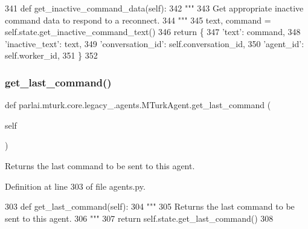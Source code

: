 \begin{DoxyCode}
341     \textcolor{keyword}{def }get\_inactive\_command\_data(self):
342         \textcolor{stringliteral}{"""}
343 \textcolor{stringliteral}{        Get appropriate inactive command data to respond to a reconnect.}
344 \textcolor{stringliteral}{        """}
345         text, command = self.state.get\_inactive\_command\_text()
346         \textcolor{keywordflow}{return} \{
347             \textcolor{stringliteral}{'text'}: command,
348             \textcolor{stringliteral}{'inactive\_text'}: text,
349             \textcolor{stringliteral}{'conversation\_id'}: self.conversation\_id,
350             \textcolor{stringliteral}{'agent\_id'}: self.worker\_id,
351         \}
352 
\end{DoxyCode}
\mbox{\label{classparlai_1_1mturk_1_1core_1_1legacy__2018_1_1agents_1_1MTurkAgent_af74c2cb4a0eb7c1e7c9f57346b16bfbb}} 
\subsubsection{\texorpdfstring{get\+\_\+last\+\_\+command()}{get\_last\_command()}}
{\footnotesize\ttfamily def parlai.\+mturk.\+core.\+legacy\+\_.\+agents.\+M\+Turk\+Agent.\+get\+\_\+last\+\_\+command (\begin{DoxyParamCaption}\item[{}]{self }\end{DoxyParamCaption})}

\begin{DoxyVerb}Returns the last command to be sent to this agent.
\end{DoxyVerb}
 

Definition at line 303 of file agents.\+py.


\begin{DoxyCode}
303     \textcolor{keyword}{def }get\_last\_command(self):
304         \textcolor{stringliteral}{"""}
305 \textcolor{stringliteral}{        Returns the last command to be sent to this agent.}
306 \textcolor{stringliteral}{        """}
307         \textcolor{keywordflow}{return} self.state.get\_last\_command()
308 
\end{DoxyCode}
\mbox{\label{classparlai_1_1mturk_1_1core_1_1legacy__2018_1_1agents_1_1MTurkAgent_a65cc11f8cdca69113217f82d11bdfcc3}} 
